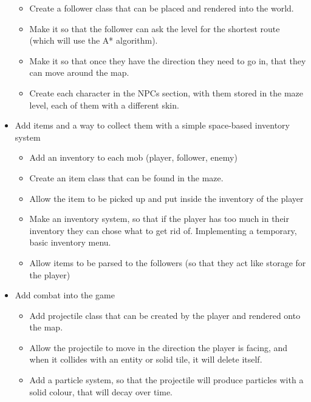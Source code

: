 \documentclass{article}
\begin{document}
\begin{itemize}
\begin{itemize}
                        \item Create a follower class that can be placed and rendered into the world.
                        \item Make it so that the follower can ask the level for the shortest route (which will use the A* algorithm).
                        \item Make it so that once they have the direction they need to go in, that they can move around the map.
                        \item Create each character in the NPCs section, with them stored in the maze level, each of them with a different skin.
                    \end{itemize}
                \item Add items and a way to collect them with a simple space-based inventory system
                    \begin{itemize}
                        \item Add an inventory to each mob (player, follower, enemy)
                        \item Create an item class that can be found in the maze.
                        \item Allow the item to be picked up and put inside the inventory of the player
                        \item Make an inventory system, so that if the player has too much in their inventory they can chose what to get rid of. Implementing a temporary, basic inventory menu.
                        \item Allow items to be parsed to the followers (so that they act like storage for the player)
                    \end{itemize}
                \item Add combat into the game
                    \begin{itemize}
                        \item Add projectile class that can be created by the player and rendered onto the map.
                        \item Allow the projectile to move in the direction the player is facing, and when it collides with an entity or solid tile, it will delete itself.
                        \item Add a particle system, so that the projectile will produce particles with a solid colour, that will decay over time.

\end{itemize}
\end{itemize}
\end{document}
